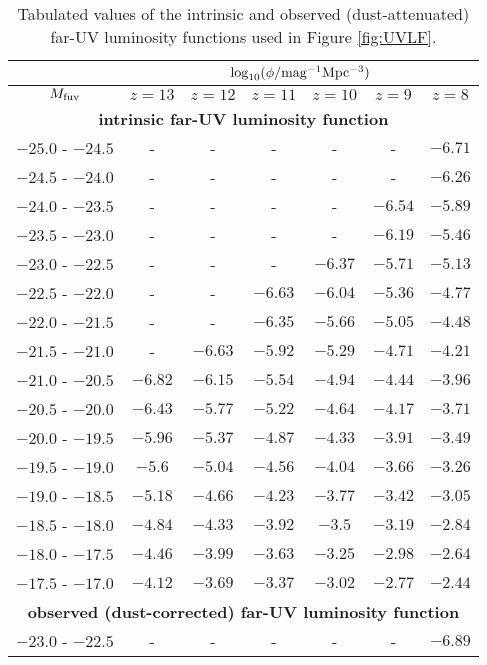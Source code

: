 \begin{table*}
\caption{Tabulated values of the intrinsic and observed (dust-attenuated) far-UV luminosity functions used in Figure \ref{fig:UVLF}.}
\label{tab:UVLF}
\begin{tabular}{ccccccc}
\hline
    & \multicolumn{6}{c}{$\log_{10}(\phi/{\rm mag^{-1}Mpc^{-3}})$} \\
        \hline
$M_{\rm fuv}$ & $z=13$ & $z=12$ & $z=11$ & $z=10$ & $z=9$ & $z=8$  \\
\hline
 \multicolumn{7}{c}{{\bf intrinsic far-UV luminosity function}} \\
\hline
 $ -25.0$ - $-24.5 $  & - & - & - & - & - & $-6.71$\\
 $ -24.5$ - $-24.0 $  & - & - & - & - & - & $-6.26$\\
 $ -24.0$ - $-23.5 $  & - & - & - & - & $-6.54$ & $-5.89$\\
 $ -23.5$ - $-23.0 $  & - & - & - & - & $-6.19$ & $-5.46$\\
 $ -23.0$ - $-22.5 $  & - & - & - & $-6.37$ & $-5.71$ & $-5.13$\\
 $ -22.5$ - $-22.0 $  & - & - & $-6.63$ & $-6.04$ & $-5.36$ & $-4.77$\\
 $ -22.0$ - $-21.5 $  & - & - & $-6.35$ & $-5.66$ & $-5.05$ & $-4.48$\\
 $ -21.5$ - $-21.0 $  & - & $-6.63$ & $-5.92$ & $-5.29$ & $-4.71$ & $-4.21$\\
 $ -21.0$ - $-20.5 $  & $-6.82$ & $-6.15$ & $-5.54$ & $-4.94$ & $-4.44$ & $-3.96$\\
 $ -20.5$ - $-20.0 $  & $-6.43$ & $-5.77$ & $-5.22$ & $-4.64$ & $-4.17$ & $-3.71$\\
 $ -20.0$ - $-19.5 $  & $-5.96$ & $-5.37$ & $-4.87$ & $-4.33$ & $-3.91$ & $-3.49$\\
 $ -19.5$ - $-19.0 $  & $-5.6$ & $-5.04$ & $-4.56$ & $-4.04$ & $-3.66$ & $-3.26$\\
 $ -19.0$ - $-18.5 $  & $-5.18$ & $-4.66$ & $-4.23$ & $-3.77$ & $-3.42$ & $-3.05$\\
 $ -18.5$ - $-18.0 $  & $-4.84$ & $-4.33$ & $-3.92$ & $-3.5$ & $-3.19$ & $-2.84$\\
 $ -18.0$ - $-17.5 $  & $-4.46$ & $-3.99$ & $-3.63$ & $-3.25$ & $-2.98$ & $-2.64$\\
 $ -17.5$ - $-17.0 $  & $-4.12$ & $-3.69$ & $-3.37$ & $-3.02$ & $-2.77$ & $-2.44$\\
\hline
 \multicolumn{7}{c}{{\bf observed (dust-corrected) far-UV luminosity function}} \\
\hline
 $ -23.0$ - $-22.5 $  & - & - & - & - & - & $-6.89$\\

\end{tabular}
\end{table*}
